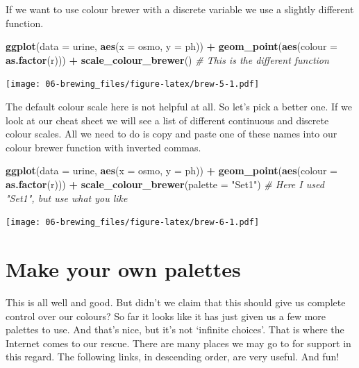 \documentclass[]{book}
\newenvironment{Shaded}{\begin{snugshade}}{\end{snugshade}}
\newcommand{\KeywordTok}[1]{\textcolor[rgb]{0.13,0.29,0.53}{\textbf{#1}}}
\newcommand{\DataTypeTok}[1]{\textcolor[rgb]{0.13,0.29,0.53}{#1}}
\newcommand{\StringTok}[1]{\textcolor[rgb]{0.31,0.60,0.02}{#1}}
\newcommand{\CommentTok}[1]{\textcolor[rgb]{0.56,0.35,0.01}{\textit{#1}}}
\newcommand{\OperatorTok}[1]{\textcolor[rgb]{0.81,0.36,0.00}{\textbf{#1}}}
\newcommand{\NormalTok}[1]{#1}
\theoremstyle{definition}
\theoremstyle{definition}
\theoremstyle{definition}
\theoremstyle{remark}
\begin{document}
If we want to use colour brewer with a discrete variable we use a
slightly different function.

\begin{Shaded}
\begin{Highlighting}[]
\KeywordTok{ggplot}\NormalTok{(}\DataTypeTok{data =}\NormalTok{ urine, }\KeywordTok{aes}\NormalTok{(}\DataTypeTok{x =}\NormalTok{ osmo, }\DataTypeTok{y =}\NormalTok{ ph)) }\OperatorTok{+}
\StringTok{  }\KeywordTok{geom_point}\NormalTok{(}\KeywordTok{aes}\NormalTok{(}\DataTypeTok{colour =} \KeywordTok{as.factor}\NormalTok{(r))) }\OperatorTok{+}
\StringTok{  }\KeywordTok{scale_colour_brewer}\NormalTok{() }\CommentTok{# This is the different function}
\end{Highlighting}
\end{Shaded}

\texttt{[image: 06-brewing\_files/figure-latex/brew-5-1.pdf]}

The default colour scale here is not helpful at all. So let's pick a
better one. If we look at our cheat sheet we will see a list of
different continuous and discrete colour scales. All we need to do is
copy and paste one of these names into our colour brewer function with
inverted commas.

\begin{Shaded}
\begin{Highlighting}[]
\KeywordTok{ggplot}\NormalTok{(}\DataTypeTok{data =}\NormalTok{ urine, }\KeywordTok{aes}\NormalTok{(}\DataTypeTok{x =}\NormalTok{ osmo, }\DataTypeTok{y =}\NormalTok{ ph)) }\OperatorTok{+}
\StringTok{  }\KeywordTok{geom_point}\NormalTok{(}\KeywordTok{aes}\NormalTok{(}\DataTypeTok{colour =} \KeywordTok{as.factor}\NormalTok{(r))) }\OperatorTok{+}
\StringTok{  }\KeywordTok{scale_colour_brewer}\NormalTok{(}\DataTypeTok{palette =} \StringTok{"Set1"}\NormalTok{) }\CommentTok{# Here I used "Set1", but use what you like}
\end{Highlighting}
\end{Shaded}

\texttt{[image: 06-brewing\_files/figure-latex/brew-6-1.pdf]}

\section{Make your own palettes}\label{make-your-own-palettes}

This is all well and good. But didn't we claim that this should give us
complete control over our colours? So far it looks like it has just
given us a few more palettes to use. And that's nice, but it's not
`infinite choices'. That is where the Internet comes to our rescue.
There are many places we may go to for support in this regard. The
following links, in descending order, are very useful. And fun!
\end{document}

